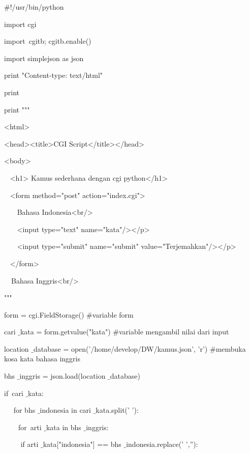 \begin{enumerate}
\noindent 
$  \#  $!/usr/bin/python \par
\noindent 
import cgi \par
\noindent 
import~cgitb; cgitb.enable()   \par
\noindent 
import simplejson as json \par
\vspace{12pt}
\noindent 
print "Content-type: text/html" \par
\noindent 
print \par
\vspace{12pt}
\noindent 
print """ \par
\noindent 
<html> \par
\noindent 
<head><title>CGI Script</title></head> \par
\noindent 
<body> \par
\noindent 
~ <h1> Kamus sederhana dengan cgi python</h1> \par
\noindent 
~ <form method="post" action="index.cgi"> \par
\noindent 
~~~ Bahasa Indonesia<br/> \par
\noindent 
~~~ <input type="text" name="kata"/></p> \par
\noindent 
~~~ <input type="submit" name="submit" value="Terjemahkan"/></p> \par
\noindent 
~ </form> \par
\noindent 
~~Bahasa Inggris<br/>   \par
\noindent 
""" \par
\vspace{12pt}
\noindent 
form = cgi.FieldStorage()  $  \#  $variable form \par
\noindent 
cari $  \_  $kata = form.getvalue("kata")  $  \#  $variable mengambil nilai dari input \par
\vspace{12pt}
\noindent 
location $  \_  $database = open('/home/develop/DW/kamus.json', 'r')  $  \#  $membuka kosa kata bahasa inggris \par
\noindent 
bhs $  \_  $inggris = json.load(location $  \_  $database) \par
\vspace{12pt}
\noindent 
if~cari $  \_  $kata:~   \par
\noindent 
~~ for bhs $  \_  $indonesia in cari $  \_  $kata.split(' '):  \par
\noindent 
~~~~for~arti $  \_  $kata in bhs $  \_  $inggris:    \par
\noindent 
~~~~ if arti $  \_  $kata["indonesia"] == bhs $  \_  $indonesia.replace(' ',''): \par

\end{enumerate}
